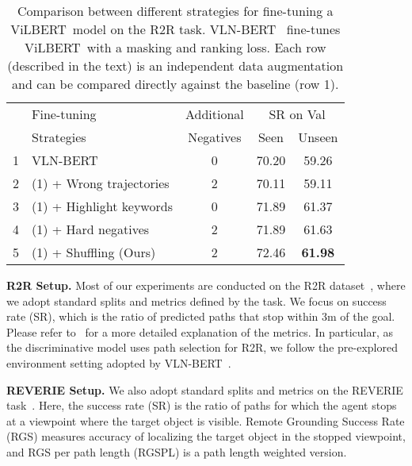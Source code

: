 \RequirePackage[dvipsnames,table]{xcolor} \documentclass[10pt,twocolumn,letterpaper]{article}
\newcommand{\p}[1]{\vspace{1mm}\noindent\textbf{#1}}
\newcommand{\vilbert}{ViLBERT}
\newcommand{\vlnbert}{VLN-BERT}
\begin{document}
 \begin{table}[t]
\centering
\small
\tabcolsep=0.10cm
\begin{tabular}{ll c | cc}
\toprule
  & Fine-tuning & Additional &
  \multicolumn{2}{c}{SR on Val} \\
   & Strategies & Negatives & Seen & Unseen
  \\   \midrule
1 & VLN-BERT ~\cite{majumdar2020vlnbert} & 0
    & 70.20 & 59.26 \\
2 & (1) + Wrong trajectories & 2
    & 70.11 & 59.11 \\
3 & (1) + Highlight keywords & 0
    & 71.89 & 61.37 \\
4 & (1) + Hard negatives & 2
    & 71.89 & 61.63 \\
5 & (1) + Shuffling (Ours) & 2
    & 72.46 & \textbf{61.98} \\
\bottomrule
\end{tabular}
\vspace{-2mm}
\caption{Comparison between different strategies for fine-tuning a \vilbert~model on the R2R task.
\vlnbert~\cite{majumdar2020vlnbert} fine-tunes \vilbert~with a masking and ranking loss.
Each row (described in the text) is an independent data augmentation and can be compared directly against the baseline (row 1).
}
\vspace{-4mm}
\label{tab:dataaug-r2r}
\end{table}




 
\p{R2R Setup.}
Most of our experiments are conducted on the R2R dataset~\cite{anderson2018r2r}, where we adopt standard splits and metrics defined by the task.
We focus on success rate (SR), which is the ratio of predicted paths that stop within 3m of the goal.
Please refer to~\cite{anderson2018r2r, majumdar2020vlnbert} for a more detailed explanation of the metrics.
In particular, as the discriminative model uses path selection for R2R, we follow the pre-explored environment setting adopted by \vlnbert~\cite{majumdar2020vlnbert}.



\p{REVERIE Setup.}
We also adopt standard splits and metrics on the REVERIE task~\cite{qi2020reverie}.
Here, the success rate (SR) is the ratio of paths for which the agent stops at a viewpoint where the target object is visible.
Remote Grounding Success Rate (RGS) measures accuracy of localizing the target object in the stopped viewpoint, and RGS per path length (RGSPL) is a path length weighted version.
\end{document}
